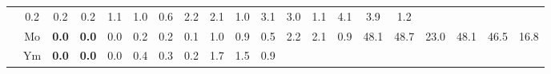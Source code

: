 \documentclass[french,10pt]{article}
\begin{document}
\begin{landscape}
\begin{longtable}{ l  c | c c c | c c c | c c c | c c c | c c c | c c c | }
    
                    &                     0.2
     & {\footnotesize     0.2
    } & {\footnotesize     0.2
     }
    
    
                    &                     1.1
     & {\footnotesize     1.0
    } & {\footnotesize     0.6
     }
    
    
                    &                     2.2
     & {\footnotesize     2.1
    } & {\footnotesize     1.0
     }
    
    
                    &                     3.1
     & {\footnotesize     3.0
    } & {\footnotesize     1.1
     }
    
    
                    &                     4.1
     & {\footnotesize     3.9
    } & {\footnotesize     1.2
     }
    
    
                    \\*
                        & {\small Mo  }

                    &                     \textbf{ 0.0}
     & {\footnotesize     \textbf{ 0.0}
    } & {\footnotesize     0.0
     }
    
    
                    &                     0.2
     & {\footnotesize     0.2
    } & {\footnotesize     0.1
     }
    
    
                    &                     1.0
     & {\footnotesize     0.9
    } & {\footnotesize     0.5
     }
    
    
                    &                     2.2
     & {\footnotesize     2.1
    } & {\footnotesize     0.9
     }
    
    
                    &                     48.1
     & {\footnotesize     48.7
    } & {\footnotesize     23.0
     }
    
    
                    &                     48.1
     & {\footnotesize     46.5
    } & {\footnotesize     16.8
     }
    
    
                    \\*
                        & {\small Ym  }

                    &                     \textbf{ 0.0}
     & {\footnotesize     \textbf{ 0.0}
    } & {\footnotesize     0.0
     }
    
    
                    &                     0.4
     & {\footnotesize     0.3
    } & {\footnotesize     0.2
     }
    
    
                    &                     1.7
     & {\footnotesize     1.5
    } & {\footnotesize     0.9
     }
    

\end{longtable}
\end{landscape}
\end{document}
